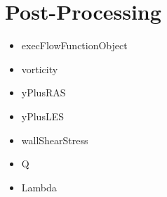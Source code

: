 \chapter{Post-Processing}
\begin{itemize}
	\item execFlowFunctionObject
	\item vorticity
	\item yPlusRAS
	\item yPlusLES
	\item wallShearStress
	\item Q
	\item Lambda
\end{itemize}
\newpage